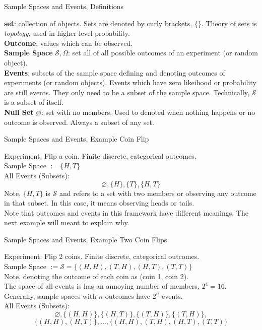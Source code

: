 \documentclass{beamer}
\newcommand{\nl}[1]{\vspace{#1 em}}
\let\emptyset\varnothing
\begin{document}
\begin{frame}{Sample Spaces and Events, Definitions}

    {\bf set}: collection of objects. Sets are denoted by curly brackets, $\{\}$. Theory of sets is \textit{topology}, used in higher level probability.\\
    \nl{0.5}
    {\bf Outcome}: values which can be observed.\\
    \nl{0.5}
    {\bf Sample Space }$\mathcal{S}, \Omega$: set all of all possible outcomes of an experiment (or random object).\\
    \nl{0.5}
    {\bf Events}: subsets of the sample space defining and denoting outcomes of experiments (or random objects). Events which have zero likeihood or probability are still events. They only need to be a subset of the sample space.  Technically, $\mathcal{S}$ is a subset of itself.\\
    \nl{0.5}
    {\bf Null Set} $\emptyset$: set with no members. Used to denoted when nothing happens or no outcome is observed. Always a subset of any set.
\end{frame}

\begin{frame}{Sample Spaces and Events, Example Coin Flip}

    Experiment: Flip a coin. Finite discrete, categorical outcomes.\\
    \nl{1}
    Sample Space $:= \{ H,T\}$\\
    \nl{0.5}
    All Events (Subsets):
    \[\emptyset, \{ H \}, \{ T\}, \{ H, T\}\]
    Note, $\{H,T\}$ is $\mathcal{S}$ and refers to a set with two members or observing any outcome in that subset. In this case, it means observing heads or tails.\\
    \nl{0.5}
    Note that outcomes and events in this framework have different meanings. The next example will meant to explain why.
\end{frame}


\begin{frame}{Sample Spaces and Events, Example Two Coin Flips}

    Experiment: Flip 2 coins. Finite discrete, categorical outcomes.\\
    \nl{1}
    Sample Space $:= \mathcal{S} = \{ (H,H),(T,H),(H,T), (T,T)\}$\\
    \nl{0.5}
    Note, denoting the outcome of each coin as (coin 1, coin 2).\\
    \nl{0.5}
    The space of all events is has an annoying number of members, $2^4 = 16$. Generally, sample spaces with $n$ outcomes have $2^n$ events.\\
    \nl{0.5}
    All Events (Subsets):
    \[\emptyset, \{ (H,H) \}, \{ (H, T)\}, \{ (T, H)\}, \{ (T, H)\},\]
    \[\{(H,H),(H,T)\}, \ldots, \{ (H,H),(T,H),(H,T), (T,T)\}\]
\end{frame}
\end{document}
